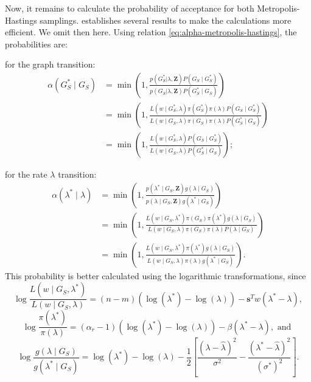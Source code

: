 Now, it remains to calculate the probability of acceptance for both
Metropolis-Hastings samplings. \textcite{crawford2016} 
establishes several results to make the calculations more efficient. We omit
then here. Using relation \eqref{eq:alpha-metropolis-hastings}, the probabilities are: 

\begin{alineas}
  \item for the graph transition:
  \begin{equation*}
    \begin{split}
      \alpha(G_S^* \mid G_S) &= \min\left(1, \frac{p (G_S^*| \lambda, \boldsymbol{Z})P(G_S \mid G_S^*)}{p (G_S | \lambda, \boldsymbol{Z}) P(G_S^* \mid G_S)}\right) \\
      &= \min\left(1, \frac{L(w \mid G_S^*, \lambda)\pi(G_S^*)\pi(\lambda)P(G_S \mid G_S^*)}{ L(w \mid G_S, \lambda)\pi(G_S)\pi(\lambda)P(G_S^* \mid G_S)}\right) \\
      &= \min\left(1, \frac{L(w \mid G_S^*, \lambda)P(G_S \mid G_S^*)}{ L(w \mid G_S, \lambda)P(G_S^* \mid G_S)}\right);
    \end{split}
  \end{equation*}
  \item for the rate $\lambda$ transition:
  \begin{equation*}
    \begin{split}
      \alpha(\lambda^* \mid \lambda) &= \min\left(1, \frac{p (\lambda^* \mid  G_S,  \boldsymbol{Z})g(\lambda \mid G_S)}{p (\lambda \mid G_S, \boldsymbol{Z}) g(\lambda^* \mid G_S)}\right) \\
      &= \min\left(1, \frac{L(w \mid G_S, \lambda^*)\pi(G_S)\pi(\lambda^*)g(\lambda \mid G_S)}{ L(w \mid G_S, \lambda)\pi(G_S)\pi(\lambda)P(\lambda \mid G_S)}\right) \\
      &= \min\left(1, \frac{L(w \mid G_S, \lambda^*)\pi(\lambda^*)g(\lambda \mid G_S)}{ L(w \mid G_S, \lambda)\pi(\lambda) g(\lambda^* \mid G_S)}\right).
    \end{split}
  \end{equation*}
  This probability is better calculated using the logarithmic transformations,
  since 
  $$
  \log \frac{L(w \mid G_S, \lambda^*)}{ L(w \mid G_S, \lambda)} = (n-m)\left(\log(\lambda^*) - \log(\lambda)\right) - \boldsymbol{s}^Tw(\lambda^* - \lambda),
  $$
  $$
  \log \frac{\pi(\lambda^*)}{\pi(\lambda)} = (\alpha_r - 1)(\log(\lambda^*) - \log(\lambda)) - \beta(\lambda^* - \lambda), \text{ and }
  $$
  $$
  \log \frac{g(\lambda \mid G_S)}{g(\lambda^* \mid G_S)} = \log(\lambda^*) - \log(\lambda) - \frac{1}{2}\left[\frac{(\lambda - \hat{\lambda})^2}{\sigma^2} - \frac{(\lambda^* - \hat{\lambda})^2}{(\sigma^*)^2}\right].
  $$
\end{alineas}

